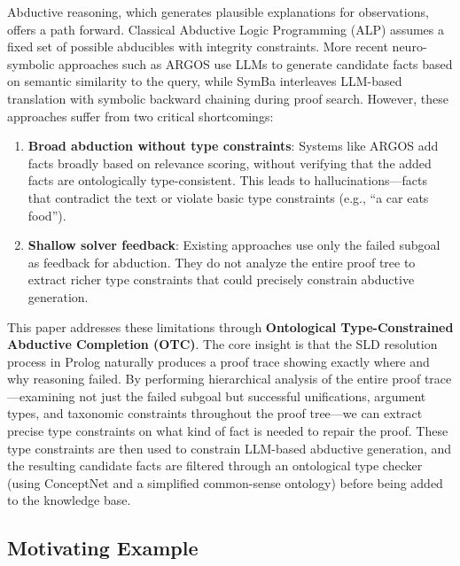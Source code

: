 \documentclass[11pt,letterpaper]{article}
\begin{document}
Abductive reasoning, which generates plausible explanations for observations, offers a path forward. Classical Abductive Logic Programming (ALP) \cite{Kakas1993, Inoue1991} assumes a fixed set of possible abducibles with integrity constraints. More recent neuro-symbolic approaches such as ARGOS \cite{Cotnareanu2025} use LLMs to generate candidate facts based on semantic similarity to the query, while SymBa \cite{Lee2024} interleaves LLM-based translation with symbolic backward chaining during proof search. However, these approaches suffer from two critical shortcomings:

\begin{enumerate}
    \item \textbf{Broad abduction without type constraints}: Systems like ARGOS add facts broadly based on relevance scoring, without verifying that the added facts are ontologically type-consistent. This leads to hallucinations---facts that contradict the text or violate basic type constraints (e.g., ``a car eats food'').
    
    \item \textbf{Shallow solver feedback}: Existing approaches use only the failed subgoal as feedback for abduction. They do not analyze the entire proof tree to extract richer type constraints that could precisely constrain abductive generation.
\end{enumerate}

This paper addresses these limitations through \textbf{Ontological Type-Constrained Abductive Completion (OTC)}. The core insight is that the SLD resolution process in Prolog naturally produces a proof trace showing exactly where and why reasoning failed. By performing hierarchical analysis of the entire proof trace---examining not just the failed subgoal but successful unifications, argument types, and taxonomic constraints throughout the proof tree---we can extract precise type constraints on what kind of fact is needed to repair the proof. These type constraints are then used to constrain LLM-based abductive generation, and the resulting candidate facts are filtered through an ontological type checker (using ConceptNet and a simplified common-sense ontology) before being added to the knowledge base.

\subsection{Motivating Example}
\end{document}
